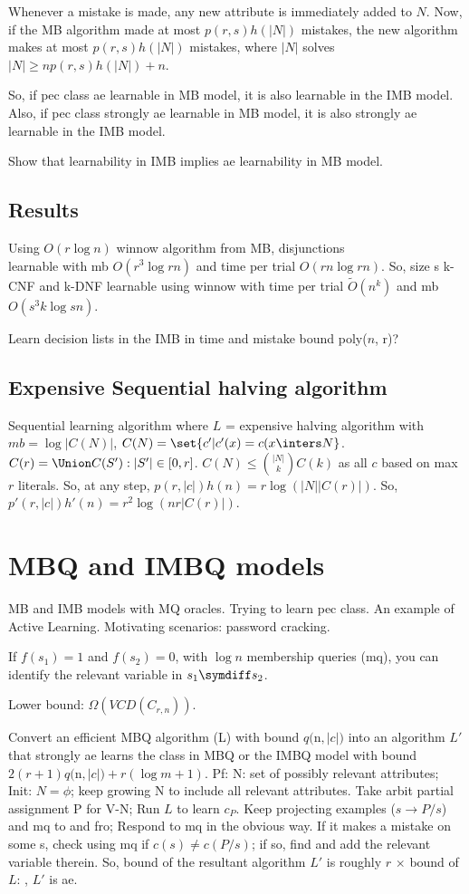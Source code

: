 \documentclass[oneside, article]{memoir}
\begin{document}
Whenever a mistake is made, any new attribute is immediately added to $N$. Now, if the MB algorithm made at most $p(r, s)h(|N|)$ mistakes, the new algorithm makes at most $p(r, s)h(|N|)$ mistakes, where $|N|$ solves $|N| \geq n p(r, s)h(|N|) + n$.

So, if pec class ae learnable in MB model, it is also learnable in the IMB model. Also, if pec class strongly ae learnable in MB model, it is also strongly ae learnable in the IMB model.

\oprob Show that learnability in IMB implies ae learnability in MB model.

\subsection{Results}
Using $O(r \log n)$ winnow algorithm from MB, disjunctions \\
learnable with mb $O(r^{3} \log rn)$ and time per trial $O(rn \log rn)$. So, size s k-CNF and k-DNF learnable using winnow with time per trial $\tilde{O}(n^{k})$ and mb $O(s^{3}k \log sn)$.

\oprob Learn decision lists in the IMB in time and mistake bound poly($n$, r)?

\subsection{Expensive Sequential halving algorithm}
Sequential learning algorithm where $L$ = expensive halving algorithm with $mb = \log |C(N)|$, $C(N) = \set{c' | c'(x) = c(x \inters N}$. $C(r) = \Union C(S') : |S'|\in[0,r]$. $C(N) \leq \binom{|N|}{k}C(k)$ as all $c$ based on max $r$ literals. So, at any step, $p(r, |c|)h(n) = r\log(|N||C(r)|)$. So, $p'(r, |c|)h'(n) = r^{2}\log (nr|C(r)|)$.

\section{MBQ and IMBQ models}
MB and IMB models with MQ oracles. Trying to learn pec class. An example of Active Learning. Motivating scenarios: password cracking.

If $f(s_1) = 1$ and $f(s_2)=0$, with $\log n$ membership queries (mq), you can identify the relevant variable in $s_1 \symdiff s_2$.

Lower bound: $\Omega(VCD(C_{r,n}))$. \why

Convert an efficient MBQ algorithm (L) with bound $q($n$, |c|)$ into an algorithm $L'$ that  strongly ae learns the class in MBQ or the IMBQ model with bound $2(r+1)q($n$, |c|) +r(\log m + 1)$. Pf: N: set of possibly relevant attributes; Init: $N = \phi$; keep growing N to include all relevant attributes. Take arbit partial assignment P for V-N; Run $L$ to learn $c_P$. Keep projecting examples ($s \to P/s$) and mq to and fro; Respond to mq in the obvious way. If it makes a mistake on some s, check using mq if $c(s) \neq c(P/s)$; if so, find and add the relevant variable therein. So, bound of the resultant algorithm $L'$  is roughly $r$ $\times$ bound of $L$: $ $, $L'$  is ae.
\end{document}
